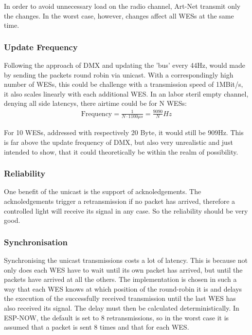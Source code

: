In order to avoid unnecessary load on the radio channel, Art-Net transmit only the changes.
In the worst case, however, changes affect all WESs at the same time.

\subsubsection*{Update Frequency}
Following the approach of DMX and updating the 'bus' every 44Hz, would made by sending the packets round robin via unicast. 
With a correspondingly high number of WESs, this could be challenge with a transmission speed of 1MBit/s, 
it also scales linearly with each additional WES. 
In an labor steril empty channel, denying all side latencys, there airtime could be for N WESs:
\begin{align}
	\text{Frequency} = \frac{1}{N \cdot 1100\mu s} = \frac{9090}{N} Hz
\end{align}

For 10 WESs, addressed with respectively 20 Byte, it would still be 909Hz.
This is far above the update frequency of DMX, but also very unrealistic and just intended to show,
that it could theoretically be within the realm of possibility.

\subsubsection*{Reliability}

One benefit of the unicast is the support of acknoledgements. 
The acknoledgements trigger a retransmission if no packet has arrived, therefore a controlled light will receive its signal in any case.
So the reliability should be very good.

\subsubsection*{Synchronisation}

Synchronising the unicast transmissions costs a lot of latency.
This is because not only does each WES have to wait until its own packet has arrived,
but until the packets have arrived at all the others.
The implementation is chosen in such a way that each WES knows at which position of the round-robin it is
and delays the execution of the successfully received transmission until the last WES has also received its signal.
The delay must then be calculated deterministically.
In ESP-NOW, the default is set to 8 retransmissions, so in the worst case it is assumed that a packet is sent 8 times
and that for each WES.

